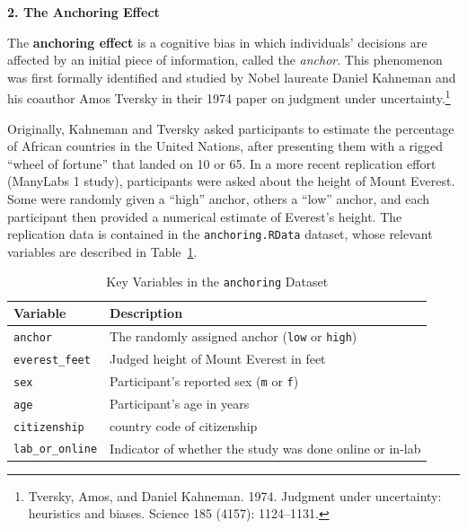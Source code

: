 \documentclass[12pt]{article}
\begin{document}


\begin{center}
    \textbf{\large 2. The Anchoring Effect}    
\end{center}

The \textbf{anchoring effect} is a cognitive bias in which individuals’ decisions are affected by an initial piece of information, called the \emph{anchor}. This phenomenon was first formally identified and studied by Nobel laureate Daniel Kahneman and his coauthor Amos Tversky in their 1974 paper on judgment under uncertainty.\footnote{Tversky, Amos, and Daniel Kahneman. 1974. Judgment under uncertainty: heuristics and biases.
Science 185 (4157): 1124–1131.}

Originally, Kahneman and Tversky asked participants to estimate the percentage of African countries in the United Nations, after presenting them with a rigged “wheel of fortune” that landed on 10 or 65. In a more recent replication effort (ManyLabs 1 study), participants were asked about the height of Mount Everest. Some were randomly given a “high” anchor, others a “low” anchor, and each participant then provided a numerical estimate of Everest’s height. The replication data is contained in the \texttt{anchoring.RData} dataset, whose relevant variables are described in Table~\ref{tab:anchoring-data}.

\begin{table}[H]
\centering
\caption{Key Variables in the \texttt{anchoring} Dataset}\label{tab:anchoring-data}
\begin{tabular}{ll}
\toprule
\textbf{Variable} & \textbf{Description} \\
\midrule
\texttt{anchor}       & The randomly assigned anchor (\texttt{low} or \texttt{high}) \\
\texttt{everest\_feet}& Judged height of Mount Everest in feet \\
\texttt{sex}          & Participant’s reported sex (\texttt{m} or \texttt{f}) \\
\texttt{age}          & Participant’s age in years \\
\texttt{citizenship}  & country code of citizenship \\
\texttt{lab\_or\_online} & Indicator of whether the study was done online or in-lab \\
\bottomrule
\end{tabular}
\end{table}
\end{document}
